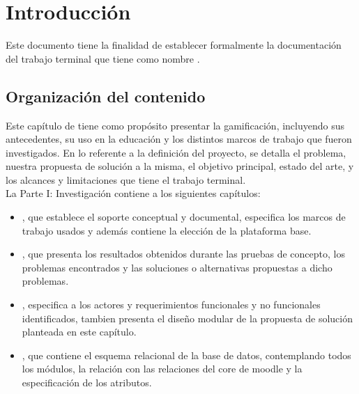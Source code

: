 \chapter{Introducción}
\label{ch:introduccion}

Este documento tiene la finalidad de establecer formalmente la documentación del trabajo terminal {\numeroTT} que tiene como nombre {\bf\tituloTT}.

\section{Organización del contenido}

Este capítulo de  tiene como propósito presentar la gamificación, incluyendo sus antecedentes, su uso en la educación y los distintos marcos de trabajo que fueron investigados. En lo referente a la definición del proyecto, se detalla el problema, nuestra propuesta de solución a la misma, el objetivo principal, estado del arte, y los alcances y limitaciones que tiene el trabajo terminal.\\

\noindent La {\pf Parte I: Investigación} contiene a los siguientes capítulos:%

    \begin{itemize}
        \item {}, que establece el soporte conceptual y documental, 
        especifica los marcos de trabajo usados y además contiene la elección de la 
        plataforma base.
        
        \item {}, que presenta los resultados obtenidos durante 
        las pruebas de concepto, los problemas encontrados y las soluciones o alternativas 
        propuestas a dicho problemas.
    
        \item {}, especifica a los actores y requerimientos funcionales
        y no funcionales identificados, tambien presenta el diseño modular de la propuesta
        de solución planteada en este capítulo.
        
        \item {}, que contiene el esquema relacional de la base de 
        datos, contemplando todos los módulos, la relación con las relaciones del core de 
        moodle y la especificación de los atributos.
    \end{itemize}

